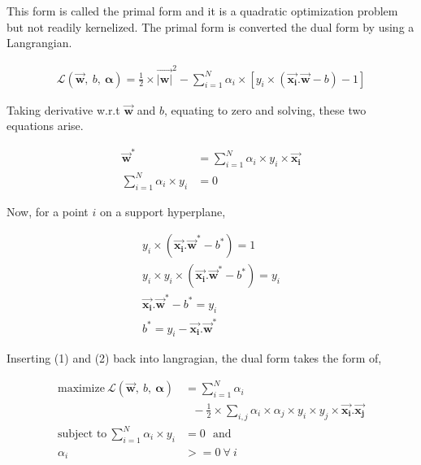 \documentclass[11pt, a4paper]{article}
\begin{document}
This form is called the primal form and it is a quadratic optimization problem but not readily kernelized. The primal form is converted the dual form by using a Langrangian.

\begin{align*}
	\mathscr{L}(\vec{\mathbf{w}},\ b,\ \bm{\alpha}) = \frac{1}{2} \times \vec{\mathbf{|w|}}^2 - \sum\limits_{i = 1}^N \alpha_i \times [ y_i \times (\vec{\mathbf{x_i}}.\vec{\mathbf{w}} - b) - 1 ] 
\end{align*}

Taking derivative w.r.t $\vec{\mathbf{w}}$ and $b$, equating to zero and solving, these two equations arise.

\begin{align}
	\vec{\mathbf{w}}^*                        & = \sum\limits_{i = 1}^N \alpha_i \times y_i \times \vec{\mathbf{x_i}} \\
	\sum\limits_{i = 1}^N \alpha_i \times y_i & = 0                                                                   
\end{align}

Now, for a point $i$ on a support hyperplane, 

\begin{align*}
	y_i \times (\vec{\mathbf{x_i}}.\vec{\mathbf{w}}^* - b^*) = 1              \\
	y_i \times y_i \times (\vec{\mathbf{x_i}}.\vec{\mathbf{w}}^* - b^*) = y_i \\    
	\vec{\mathbf{x_i}}.\vec{\mathbf{w}}^* - b^* = y_i                         \\
	b^* = y_i - \vec{\mathbf{x_i}}.\vec{\mathbf{w}}^*                         
\end{align*}

Inserting (1) and (2) back into langragian, the dual form takes the form of,

\begin{align*}
	\text{maximize}\ \mathscr{L}(\vec{\mathbf{w}},\ b,\ \bm{\alpha}) & = \sum\limits_{i = 1}^N \alpha_i                                                                                                            \\ 
	                                                                 & \ \ \ - \frac{1}{2} \times \sum\limits_{i, j} \alpha_i \times \alpha_j \times y_i \times y_j \times \vec{\mathbf{x_i}} . \vec{\mathbf{x_j}} \\
	\text{subject to}\ \sum\limits_{i = 1}^N \alpha_i \times y_i     & = 0\ \ \ \text{and}                                                                                                                         \\
	\alpha_i                                                         & >= 0\ \forall\ i                                                                                                                            
\end{align*}
\end{document}
